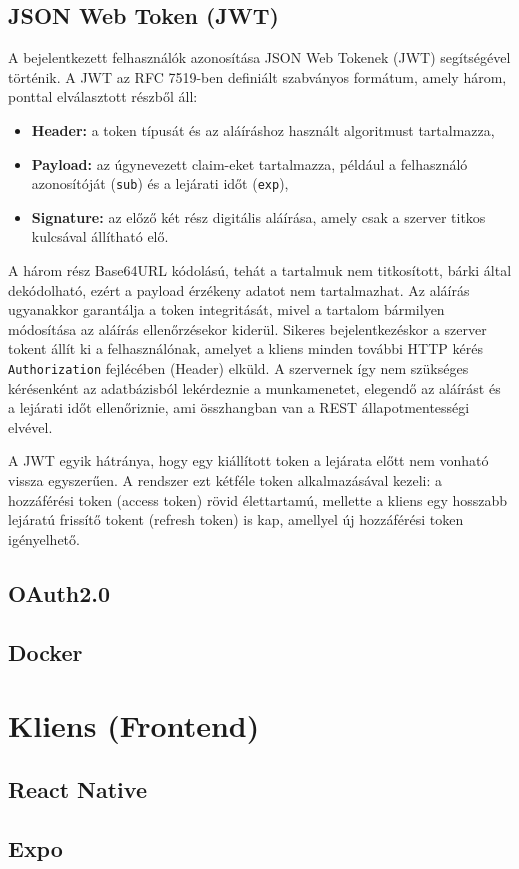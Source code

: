 \subsection{JSON Web Token (JWT)}

A bejelentkezett felhasználók azonosítása JSON Web Tokenek (JWT) \cite{JWT} segítségével történik. A JWT az RFC 7519-ben definiált szabványos formátum, amely három, ponttal elválasztott részből áll:

\begin{itemize}
	\item \textbf{Header:} a token típusát és az aláíráshoz használt algoritmust tartalmazza,
	\item \textbf{Payload:} az úgynevezett claim-eket tartalmazza, például a felhasználó azonosítóját (\texttt{sub}) és a lejárati időt (\texttt{exp}),
	\item \textbf{Signature:} az előző két rész digitális aláírása, amely csak a szerver titkos kulcsával állítható elő.
\end{itemize}

A három rész Base64URL kódolású, tehát a tartalmuk nem titkosított, bárki által dekódolható, ezért a payload érzékeny adatot nem tartalmazhat. Az aláírás ugyanakkor garantálja a token integritását, mivel a tartalom bármilyen módosítása az aláírás ellenőrzésekor kiderül. Sikeres bejelentkezéskor a szerver tokent állít ki a felhasználónak, amelyet a kliens minden további HTTP kérés \texttt{Authorization} fejlécében (Header) elküld. A szervernek így nem szükséges kérésenként az adatbázisból lekérdeznie a munkamenetet, elegendő az aláírást és a lejárati időt ellenőriznie, ami összhangban van a REST állapotmentességi elvével.

A JWT egyik hátránya, hogy egy kiállított token a lejárata előtt nem vonható vissza egyszerűen. A rendszer ezt kétféle token alkalmazásával kezeli: a hozzáférési token (access token) rövid élettartamú, mellette a kliens egy hosszabb lejáratú frissítő tokent (refresh token) is kap, amellyel új hozzáférési token igényelhető.

\subsection{OAuth2.0}

\subsection{Docker}

\section{Kliens (Frontend)}

\subsection{React Native}

\subsection{Expo}


